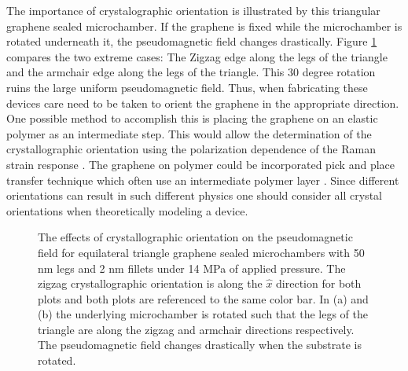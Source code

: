 The importance of crystalographic orientation is illustrated by this triangular graphene sealed microchamber.
If the graphene is fixed while the microchamber is rotated underneath it, the pseudomagnetic field changes drastically.
Figure \ref{fig:PVP:Triangle_rot} compares the two extreme cases: The Zigzag edge along the legs of the triangle and the armchair edge along the legs of the triangle.
This 30 degree rotation ruins the large uniform pseudomagnetic field.
Thus, when fabricating these devices care need to be taken to orient the graphene in the appropriate direction.
One possible method to accomplish this is placing the graphene on an elastic polymer as an intermediate step.
This would allow the determination of the crystallographic orientation using the polarization dependence of the Raman strain response \cite{Huang2009}.
The graphene on polymer could be incorporated pick and place transfer technique which often use an intermediate polymer layer \cite{Dean2010,Zomer2011}.
Since different orientations can result in such different physics one should consider all crystal orientations when theoretically modeling a device.

\begin{figure}
  \begin{center}
  
  \end{center}
  \caption[Effect of crystallographic orientation on the pseudomagnetic field]{\label{fig:PVP:Triangle_rot} 
  The effects of crystallographic orientation on the pseudomagnetic field for equilateral triangle graphene sealed microchambers with 50 nm legs and 2 nm fillets under 14 MPa of applied pressure.
  The zigzag crystallographic orientation is along the $\hat{x}$ direction for both plots and both plots are referenced to the same color bar.
  In (a) and (b) the underlying microchamber is rotated such that the legs of the triangle are along the zigzag and armchair directions respectively.
  The pseudomagnetic field changes drastically when the substrate is rotated.
  }
\end{figure}

